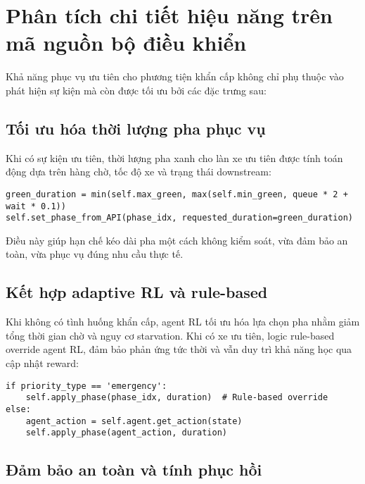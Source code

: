 \section{Phân tích chi tiết hiệu năng trên mã nguồn bộ điều khiển}

Khả năng phục vụ ưu tiên cho phương tiện khẩn cấp không chỉ phụ thuộc vào phát hiện sự kiện mà còn được tối ưu bởi các đặc trưng sau:

\subsection{Tối ưu hóa thời lượng pha phục vụ}

Khi có sự kiện ưu tiên, thời lượng pha xanh cho làn xe ưu tiên được tính toán động dựa trên hàng chờ, tốc độ xe và trạng thái downstream:

\begin{lstlisting}[style=py,caption={Tối ưu hóa thời lượng pha cho xe ưu tiên}]
green_duration = min(self.max_green, max(self.min_green, queue * 2 + wait * 0.1))
self.set_phase_from_API(phase_idx, requested_duration=green_duration)
\end{lstlisting}

Điều này giúp hạn chế kéo dài pha một cách không kiểm soát, vừa đảm bảo an toàn, vừa phục vụ đúng nhu cầu thực tế.

\subsection{Kết hợp adaptive RL và rule-based}

Khi không có tình huống khẩn cấp, agent RL tối ưu hóa lựa chọn pha nhằm giảm tổng thời gian chờ và nguy cơ starvation. Khi có xe ưu tiên, logic rule-based override agent RL, đảm bảo phản ứng tức thời và vẫn duy trì khả năng học qua cập nhật reward:

\begin{lstlisting}[style=py,caption={Override RL agent khi xuất hiện xe ưu tiên}]
if priority_type == 'emergency':
    self.apply_phase(phase_idx, duration)  # Rule-based override
else:
    agent_action = self.agent.get_action(state)
    self.apply_phase(agent_action, duration)
\end{lstlisting}



\subsection{Đảm bảo an toàn và tính phục hồi}

